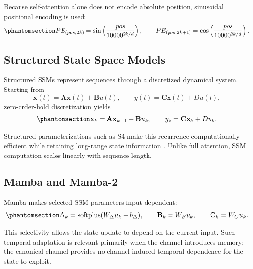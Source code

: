 Because self-attention alone does not encode absolute position, sinusoidal positional encoding is used:
\begin{equation}\protect\phantomsection\label{eq:positional-encoding}
PE_{(pos,2k)}
=
\sin\left(\frac{pos}{10000^{2k/d}}\right),
\qquad
PE_{(pos,2k+1)}
=
\cos\left(\frac{pos}{10000^{2k/d}}\right).
\end{equation}

\subsection{Structured State Space Models}\label{sec:structured-state-space-models}

Structured SSMs \cite{GuGoelRe2022SSM} represent sequences through a discretized dynamical system. Starting from
\[
\dot{\mathbf{x}}(t)
=
\mathbf{A}\mathbf{x}(t)+\mathbf{B}u(t),
\qquad
y(t)=\mathbf{C}\mathbf{x}(t)+Du(t),
\]
zero-order-hold discretization yields
\begin{equation}\protect\phantomsection\label{eq:ssm-discrete}
\mathbf{x}_k
=
\bar{\mathbf{A}}\mathbf{x}_{k-1}
+
\bar{\mathbf{B}}u_k,
\qquad
y_k
=
\mathbf{C}\mathbf{x}_k+Du_k.
\end{equation}

Structured parameterizations such as S4 make this recurrence computationally efficient while retaining long-range state information \cite{GuGoelRe2022SSM}. Unlike full attention, SSM computation scales linearly with sequence length.

\subsection{Mamba and Mamba-2}\label{sec:mamba-selective-state-spaces}

Mamba \cite{gu2023mamba} makes selected SSM parameters input-dependent:
\begin{equation}\protect\phantomsection\label{eq:mamba-selective}
\Delta_k
=
\text{softplus}(W_\Delta u_k+b_\Delta),
\qquad
\mathbf{B}_k=W_Bu_k,
\qquad
\mathbf{C}_k=W_Cu_k.
\end{equation}

This selectivity allows the state update to depend on the current input. Such temporal adaptation is relevant primarily when the channel introduces memory; the canonical channel provides no channel-induced temporal dependence for the state to exploit.

